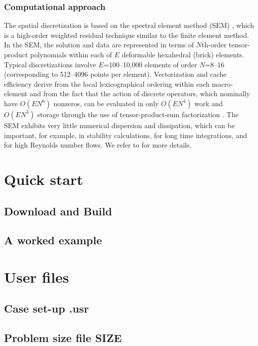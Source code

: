\documentclass[11pt]{report}              %
\begin{document}
\subsection*{Computational approach}
The spatial discretization is based on 
the spectral element method (SEM) \cite{pat84}, which is a high-order 
weighted residual technique similar to the finite element method.   
In the SEM, the solution and data are represented in terms of 
\(N\)th-order tensor-product polynomials within each of \(E\) deformable 
hexahedral (brick) elements. Typical discretizations involve \(E\)=100--10,000 elements of order 
\(N\)=8--16 (corresponding to 512--4096 points per element).
Vectorization and cache efficiency derive from the local lexicographical
ordering within each macro-element and from the fact that the action of
discrete operators, which nominally have \(O(EN^6)\) nonzeros, can be evaluated
in only \(O(EN^4)\) work and \(O(EN^3)\) storage through the use of 
tensor-product-sum factorization \cite{sao80}.   The SEM exhibits 
very little numerical dispersion and dissipation, which can be important, 
for example, in stability calculations, for long time integrations, 
and for high Reynolds number flows. We refer to \cite{dfm02} for more
details.



%

\chapter{Quick start}
\section{Download and Build}

\section{A worked example}


\chapter{User files}
\section{Case set-up .usr}

\section{Problem size file SIZE}

\end{document}
